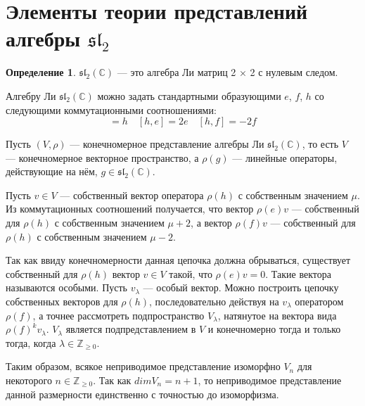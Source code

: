 \documentclass[12pt]{article}
\theoremstyle{definition}
\newtheorem{defin}[theorem]{Определение}
\begin{document}
    
 \section{Элементы теории представлений алгебры $\mathfrak{sl_2}$}
 \begin{defin}
$\mathfrak{sl_2}(\mathbb{C})$ --- это алгебра Ли матриц 2 × 2 с нулевым следом.
\end{defin}

Алгебру Ли $\mathfrak{sl_2}(\mathbb{C})$ можно задать стандартными образующими $e$, $f$, $h$ со следующими коммутационными соотношениями:
\begin{equation}
    [e, f] = h\quad
 [h, e] = 2e\quad
 [h, f] = -2f
\end{equation}

Пусть $(V, \rho)$ --- конечномерное представление алгебры Ли $\mathfrak{sl_2}(\mathbb{C})$, то есть $V$ --- конечномерное векторное пространство, а $\rho(g)$ --- линейные операторы, действующие на нём, $g \in \mathfrak{sl_2}(\mathbb{C})$.


    Пусть $v \in V$ --- собственный вектор оператора $\rho(h)$ с собственным значением $\mu$. Из коммутационных соотношений получается, что вектор $\rho(e) v$ --- собственный для $\rho(h)$ с собственным значением $\mu + 2$, а вектор $\rho(f) v$ --- собственный для $\rho(h)$ с собственным значением $\mu - 2$.


    Так как ввиду конечномерности данная цепочка должна обрываться, существует собственный для $\rho(h)$ вектор $v \in V$ такой, что $\rho(e) v = 0$. Такие вектора называются особыми. Пусть $v_{\lambda}$ --- особый вектор. Можно построить цепочку собственных векторов для $\rho(h)$, последовательно действуя на $v_{\lambda}$ оператором $\rho(f)$, а точнее рассмотреть подпространство $V_{\lambda}$, натянутое на вектора вида $\rho(f) ^ k v_{\lambda}$. $V_{\lambda}$ является подпредставлением в $V$ и конечномерно тогда и только тогда, когда $\lambda \in \mathbb{Z}_{\ge 0}$.



Таким образом, всякое неприводимое представление изоморфно $V_n$ для некоторого $n \in \mathbb{Z}_{\ge 0}$. Так как $dim V_n = n + 1$, то неприводимое представление данной размерности единственно с точностью до изоморфизма.
\end{document}
